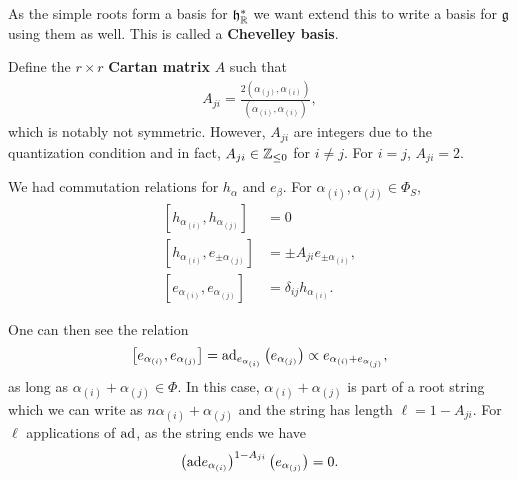 As the simple roots form a basis for $\mathfrak{h}^{*}_{\mathbb{R}}$ we want extend this to write a basis for $\mathfrak{g}$ using them as well. This is called a \textbf{Chevelley basis}.

\begin{definition}
    Define the $r \times  r$ \textbf{Cartan matrix} $A$ such that
    \begin{align}
        A_{ji} = \frac{2 \left( \alpha_{\left( j \right) }, \alpha_{\left( i \right) } \right) }{\left( \alpha_{\left( i \right) }, \alpha_{\left( i \right) } \right) }
    ,\end{align}
    which is notably not symmetric. However, $A_{ji}$ are integers due to the quantization condition and in fact, $A_{ji} \in \mathbb{Z}_{\leq 0}$ for $i \neq j$. For $i = j$, $A_{ji} = 2$.
\end{definition}

We had commutation relations for $h_{\alpha}$ and $e_{\beta}$. For $\alpha_{\left( i \right) }, \alpha_{\left( j \right) } \in \Phi_S$, 
\begin{align}
    \left[ h_{\alpha_{\left( i \right) }}, h_{\alpha_{\left( j \right) }} \right]  &= 0 \\
    \left[ h_{\alpha_{\left( i \right) }}, e_{\pm \alpha_{\left( j \right) }} \right] &= \pm A_{ji} e_{\pm \alpha_{\left( i \right)}  }, \\
    \left[ e_{\alpha_{\left( i \right) }}, e_{\alpha_{\left( j \right) }} \right] &= \delta_{ij} h_{\alpha_{\left( i \right) }}
.\end{align}

One can then see the relation
\begin{align}
    \left[ e_{\alpha_{\left( i \right) }}, e_{\alpha_{\left( j \right) }} \right] = \text{ad}_{e_{\alpha_{\left( i \right) }}} \left( e_{\alpha_{\left( j \right) }} \right) \propto e_{\alpha_{\left( i \right) } + e_{\alpha_{\left( j \right)}  }}
,\end{align}
as long as $\alpha_{\left( i \right) } + \alpha_{\left( j \right) } \in \Phi$. In this case, $\alpha_{\left( i \right) } + \alpha_{\left(j  \right) }$ is part of a root string which we can write as $n \alpha_{\left( i \right) } + \alpha_{\left( j \right)}$ and the string has length $\ell = 1 - A_{ji}$. For $\ell$ applications of $\text{ad}$, as the string ends we have
\begin{align}
    \left( \text{ad} e_{\alpha_{\left( i \right) }} \right)^{1 - A_{ji}} \left( e_{\alpha_{\left( j \right) }} \right)  = 0
.\end{align}

